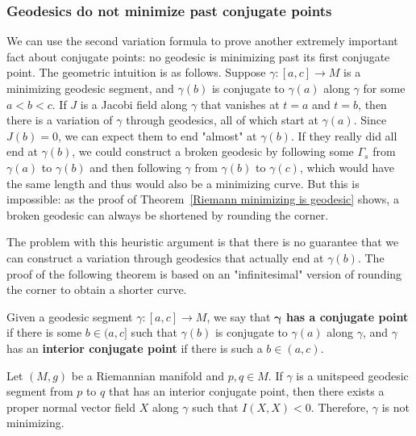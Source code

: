 \subsubsection{Geodesics do not minimize past conjugate points}
We can use the second variation formula to prove another extremely important fact about conjugate points: no geodesic is minimizing past its first conjugate point. The 
geometric intuition is as follows. Suppose $\gamma:[a,c]\to M$ is a minimizing geodesic segment, and $\gamma(b)$ is conjugate to $\gamma(a)$ along $\gamma$ for some 
$a<b<c$. If $J$ is a Jacobi field along $\gamma$ that vanishes at $t=a$ and $t=b$, then there is a variation of $\gamma$ through geodesics, all of which start at $\gamma(a)$. 
Since $J(b)=0$, we can expect them to end "almost" at $\gamma(b)$. If they really did all end at $\gamma(b)$, we could construct a broken geodesic by following some $\Gamma_s$ 
from $\gamma(a)$ to $\gamma(b)$ and then following $\gamma$ from $\gamma(b)$ to $\gamma(c)$, which would have the same length and thus would also be a minimizing curve. 
But this is impossible: as the proof of Theorem~\ref{Riemann minimizing is geodesic} shows, a broken geodesic can always be shortened by rounding the corner.\par
The problem with this heuristic argument is that there is no guarantee that we can construct a variation through geodesics that actually end at $\gamma(b)$. The proof 
of the following theorem is based on an "infinitesimal" version of rounding the corner to obtain a shorter curve.\par
Given a geodesic segment $\gamma:[a,c]\to M$, we say that \textbf{$\bm{\gamma}$ has a conjugate point} if there is some $b\in(a,c]$ such that $\gamma(b)$ is conjugate 
to $\gamma(a)$ along $\gamma$, and $\gamma$ has an \textbf{interior conjugate point} if there is such a $b\in(a,c)$.
\begin{theorem}\label{Riemann int conjugate no minimizing}
Let $(M,g)$ be a Riemannian manifold and $p,q\in M$. If $\gamma$ is a unitspeed geodesic segment from $p$ to $q$ that has an interior conjugate point, then there exists 
a proper normal vector field $X$ along $\gamma$ such that $I(X,X)<0$. Therefore, $\gamma$ is not minimizing.
\end{theorem}
